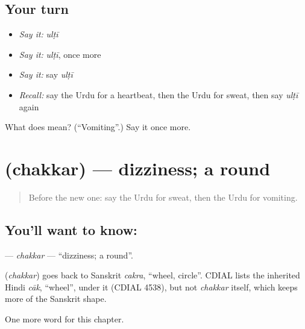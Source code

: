 \subsection*{Your turn}
\begin{itemize}
\raggedright
  \item \emph{Say it:} \emph{ulṭī}
  \item \emph{Say it:} \emph{ulṭī}, once more
  \item \emph{Say it:} say \emph{ulṭī}
  \item \emph{Recall:} say the Urdu for a heartbeat, then the Urdu for sweat, then say \emph{ulṭī} again
\end{itemize}

\begin{tcolorbox}[breakable,colback=teal!4,colframe=teal!35!black,title={Before you move on}]
What does  mean? (\textquotedblleft{}Vomiting\textquotedblright{}.) Say it once more.
\end{tcolorbox}
\section[\texorpdfstring{\ur{چکر} (chakkar)}{چکر (chakkar)}]{ (chakkar) — dizziness; a round}

\label{lesson:UR-C154-chakkar}



\begin{quote}
Before the new one: say the Urdu for sweat, then the Urdu for vomiting.
\end{quote}

\subsection*{You'll want to know: }
\textbf{} — \emph{chakkar} — \textquotedblleft{}dizziness; a round\textquotedblright{}.

\begin{cousinweb}
\textbf{} (\emph{chakkar}) goes back to Sanskrit \emph{cakra}, \textquotedblleft{}wheel, circle\textquotedblright{}. CDIAL lists the inherited Hindi \emph{cāk}, \textquotedblleft{}wheel\textquotedblright{}, under it (CDIAL 4538), but not \emph{chakkar} itself, which keeps more of the Sanskrit shape.
\end{cousinweb}

\begin{grammarlens}[title={What you've built}]
One more word for this chapter.
\end{grammarlens}


